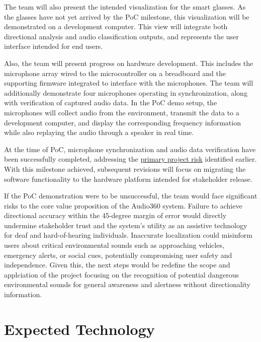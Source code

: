 \documentclass{article}
\begin{document}
The team will also present the intended visualization for the smart glasses.
As the glasses have not yet arrived by the PoC milestone, this visualization
will be demonstrated on a development computer. This view will integrate both
directional analysis and audio classification outputs, and represents the
user interface intended for end users.
\newline

Also, the team will present progress on hardware development. This includes
the microphone array wired to the microcontroller on a breadboard and the
supporting firmware integrated to interface with the microphones. The team will
additionally demonstrate four microphones operating in synchronization, along
with verification of captured audio data. In the PoC demo setup, the microphones
will collect audio from the environment, transmit the data to a development
computer, and display the corresponding frequency information while also
replaying the audio through a speaker in real time.
\newline

At the time of PoC, microphone synchronization and audio data verification
have been successfully completed, addressing the
\hyperref[risk]{primary project risk} identified earlier. With this milestone
achieved, subsequent revisions will focus on migrating the software
functionality to the hardware platform intended for stakeholder release.

If the PoC demonstration were to be unsuccessful, the team would face
significant risks to the core value proposition of the Audio360 system.
Failure to achieve directional accuracy within the 45-degree margin of error
would directly undermine stakeholder trust and the system's utility as an
assistive technology for deaf and hard-of-hearing individuals. Inaccurate
localization could misinform users about critical environmental sounds such as
approaching vehicles, emergency alerts, or social cues, potentially compromising
user safety and independence. Given this, the next steps would be redefine the 
scope and applciation of the project focusing on the recognition of potential 
dangerous environmental sounds for general awareness and alertness without 
directionality information. 
\newline

\section{Expected Technology}
\end{document}
